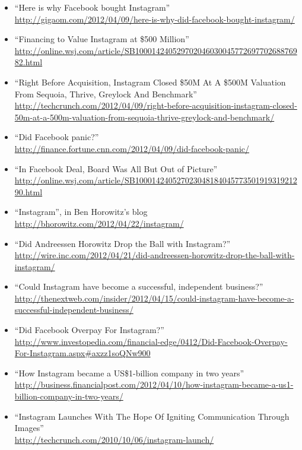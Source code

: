 \documentclass[a4paper,12pt]{article}
\begin{document}
\begin{itemize}
\item ``Here is why Facebook bought Instagram'' \\
  \url{http://gigaom.com/2012/04/09/here-is-why-did-facebook-bought-instagram/}
\item ``Financing to Value Instagram at \$500 Million'' \\
  \url{http://online.wsj.com/article/SB10001424052970204603004577269770268876982.html}
\item ``Right Before Acquisition, Instagram Closed \$50M At A \$500M Valuation From Sequoia, Thrive, Greylock And Benchmark'' \\
  \url{http://techcrunch.com/2012/04/09/right-before-acquisition-instagram-closed-50m-at-a-500m-valuation-from-sequoia-thrive-greylock-and-benchmark/}
\item ``Did Facebook panic?'' \\
  \url{http://finance.fortune.cnn.com/2012/04/09/did-facebook-panic/}
\item ``In Facebook Deal, Board Was All But Out of Picture''\\
  \url{http://online.wsj.com/article/SB10001424052702304818404577350191931921290.html}
\item ``Instagram'', in Ben Horowitz's blog \\
  \url{http://bhorowitz.com/2012/04/22/instagram/}
\item ``Did Andreessen Horowitz Drop the Ball with Instagram?'' \\
  \url{http://wire.inc.com/2012/04/21/did-andreessen-horowitz-drop-the-ball-with-instagram/}
\item ``Could Instagram have become a successful, independent business?'' \url{http://thenextweb.com/insider/2012/04/15/could-instagram-have-become-a-successful-independent-business/}
\item ``Did Facebook Overpay For Instagram?'' \\
\url{http://www.investopedia.com/financial-edge/0412/Did-Facebook-Overpay-For-Instagram.aspx#axzz1soQNw900}
\item ``How Instagram became a US\$1-billion company in two years'' \\
  \url{http://business.financialpost.com/2012/04/10/how-instagram-became-a-us1-billion-company-in-two-years/}
\item ``Instagram Launches With The Hope Of Igniting Communication Through Images'' \\
  \url{http://techcrunch.com/2010/10/06/instagram-launch/}


\end{itemize}
\end{document}
